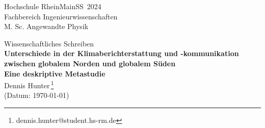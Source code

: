 \documentclass[%
fontsize=10,%
onecolumn,%
parskip=false,%
footsepline=true,%
BCOR=0pt,%
DIV=15,%
overfullrule=true,%
titlepage=false,%
]{scrartcl}
\begin{document}
\begin{flushleft}
{\Large Hochschule RheinMain\hfill SS~2024\\}Fachbereich Ingenieurwissenschaften\\M. Sc. Angewandte Physik
\end{flushleft}
\vspace{2\baselineskip}
{%
\centering
{\Large Wissenschaftliches Schreiben\\}
\vspace{2\baselineskip}
{\huge \textbf{Unterschiede in der Klimaberichterstattung und -kommunikation zwischen globalem Norden und globalem Süden}\\}
\vspace{\baselineskip}
{\Large \textbf{Eine deskriptive Metastudie}\\}
\vspace{2\baselineskip}
{\large Dennis Hunter\,\footnote{dennis.hunter@student.hs-rm.de}\\(Datum: \today)\\}
\vspace{1\baselineskip}
}

\vspace{\baselineskip}
\begin{multicols}{2}
    
    \printbibliography%
\end{multicols}
\end{document}
